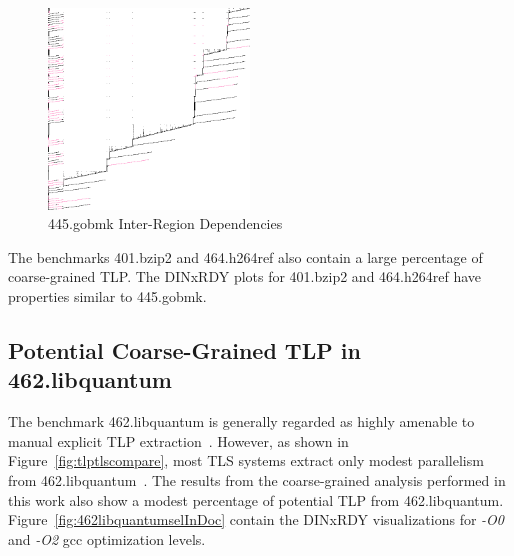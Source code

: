 \documentclass[defaultstyle,11pt]{thesis}
\begin{document}
\begin{figure}
  \centering
  \includegraphics[height=2.10in]{images/445gobmk_interfer_O0.png}
  \caption{445.gobmk Inter-Region Dependencies}
  \label{fig:445gobmkinterfer}
\end{figure}

The benchmarks 401.bzip2 and 464.h264ref also contain a large
percentage of coarse-grained TLP.  The DINxRDY plots for 401.bzip2 and
464.h264ref have properties similar to 445.gobmk.

\subsection{Potential Coarse-Grained TLP in 462.libquantum}

The benchmark 462.libquantum is generally regarded as highly amenable
to manual explicit TLP extraction~\cite{glendinning:04:ppam}.
However, as shown in Figure~\ref{fig:tlptlscompare}, most TLS systems
extract only modest parallelism from
462.libquantum~\cite{kejariwal:2007:tap}.  The results from the
coarse-grained analysis performed in this work also show a modest
percentage of potential TLP from 462.libquantum.
Figure~\ref{fig:462libquantumselInDoc} contain the DINxRDY visualizations
for \textit{-O0} and \textit{-O2} gcc optimization levels.
\end{document}
